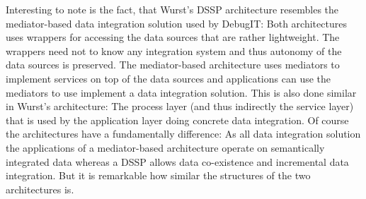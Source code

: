 Interesting to note is the fact, that Wurst's DSSP architecture resembles the mediator-based data integration solution used by DebugIT: Both architectures uses wrappers for accessing the data sources that are rather lightweight. The wrappers need not to know any integration system and thus autonomy of the data sources is preserved. The mediator-based architecture uses mediators to implement services on top of the data sources and applications can use the mediators to use implement a data integration solution. This is also done similar in Wurst's architecture: The process layer (and thus indirectly the service layer) that is used by the application layer doing concrete data integration.
Of course the architectures have a fundamentally difference: As all data integration solution the applications of a mediator-based architecture operate on semantically integrated data whereas a DSSP allows data co-existence and incremental data integration.
But it is remarkable how similar the structures of the two architectures is. 
